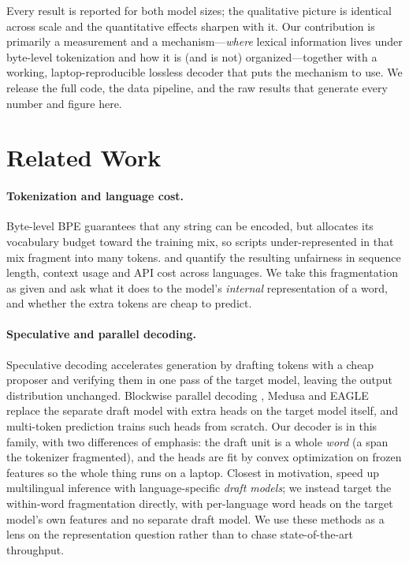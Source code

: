 Every result is reported for both model sizes; the qualitative picture is
identical across scale and the quantitative effects sharpen with it. Our
contribution is primarily a measurement and a mechanism---\emph{where} lexical
information lives under byte-level tokenization and how it is (and is not)
organized---together with a working, laptop-reproducible lossless decoder that
puts the mechanism to use. We release the full code, the data pipeline, and
the raw results that generate every number and figure here.

\section{Related Work}

\paragraph{Tokenization and language cost.} Byte-level BPE
\citep{sennrich2016bpe,radford2019gpt2} guarantees that any string can be
encoded, but allocates its vocabulary budget toward the training mix, so
scripts under-represented in that mix fragment into many tokens.
\citet{petrov2023tokenizers} and \citet{ahia2023costs} quantify the resulting
unfairness in sequence length, context usage and API cost across languages.
We take this fragmentation as given and ask what it does to the model's
\emph{internal} representation of a word, and whether the extra tokens are
cheap to predict.

\paragraph{Speculative and parallel decoding.} Speculative decoding
\citep{leviathan2023fast,chen2023accelerating} accelerates generation by
drafting tokens with a cheap proposer and verifying them in one pass of the
target model, leaving the output distribution unchanged. Blockwise parallel
decoding \citep{stern2018blockwise}, Medusa \citep{cai2024medusa} and EAGLE
\citep{li2024eagle} replace the separate draft model with extra heads on the
target model itself, and multi-token prediction \citep{gloeckle2024multitoken}
trains such heads from scratch. Our decoder is in this family, with two
differences of emphasis: the draft unit is a whole \emph{word} (a span the
tokenizer fragmented), and the heads are fit by convex optimization on frozen
features so the whole thing runs on a laptop. Closest in motivation,
\citet{yi2024multilingual} speed up multilingual inference with
language-specific \emph{draft models}; we instead target the within-word
fragmentation directly, with per-language word heads on the target model's own
features and no separate draft model. We use these methods as a lens on the
representation question rather than to chase state-of-the-art throughput.

